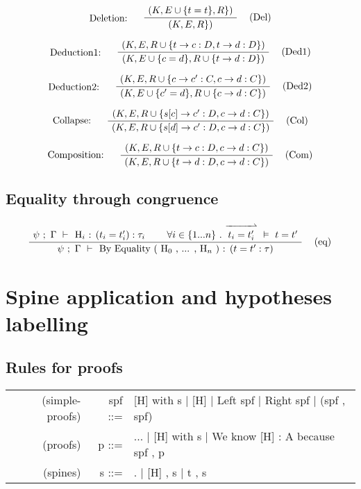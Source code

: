 \documentclass[twoside,a4paper]{article}
\theoremstyle{definition}
\begin{document}
\[
\AxiomC{$(K,E \cup \{t = t \},R\})$}
\LeftLabel{Deletion: \quad}
\RightLabel{\quad (Del)}
\UnaryInfC{$(K,E,R\})$}
\DisplayProof
\]

\[
\AxiomC{$(K,E,R \cup \{t \rightarrow c : D , t \rightarrow d : D \})$}
\LeftLabel{Deduction1: \quad}
\RightLabel{\quad (Ded1)}
\UnaryInfC{$(K,E \cup \{c = d \},R \cup \{t \rightarrow d : D\})$}
\DisplayProof
\]

\[
\AxiomC{$(K,E,R \cup \{c \rightarrow c' : C , c \rightarrow d : C \})$}
\LeftLabel{Deduction2: \quad}
\RightLabel{\quad (Ded2)}
\UnaryInfC{$(K,E \cup \{c' = d \},R \cup \{c \rightarrow d : C\})$}
\DisplayProof
\]

\[
\AxiomC{$(K,E,R \cup \{s[c] \rightarrow c' : D , c \rightarrow d : C \})$}
\LeftLabel{Collapse: \quad}
\RightLabel{\quad (Col)}
\UnaryInfC{$(K,E,R \cup \{s[d] \rightarrow c' : D , c \rightarrow d : C \})$}
\DisplayProof
\]

\[
\AxiomC{$(K,E,R \cup \{t \rightarrow c : D , c \rightarrow d : C \})$}
\LeftLabel{Composition: \quad}
\RightLabel{\quad (Com)}
\UnaryInfC{$(K,E,R \cup \{t \rightarrow d : D , c \rightarrow d : C \})$}
\DisplayProof
\]

\subsection{Equality through congruence}

\[
\AxiomC{$\psi~ ;~ \Gamma ~\vdash~$ H$_i$ : $(t_i = t_i ') : \tau_i$}
\AxiomC{$\forall i \in \{1 ... n\}~ . ~ \overset{\xrightharpoonup{~~~~~~~~}}{t_i = t_i '} ~\vDash~ t = t'$}
\RightLabel{\quad (eq)}
\BinaryInfC{$\psi~ ;~ \Gamma ~\vdash~$ By Equality ( H$_0$ , ... , H$_n$ ) : ($t = t' : \tau$)}
\DisplayProof
\]

\section{Spine application and hypotheses labelling}

\subsection{Rules for proofs}

\begin{center}
\begin{tabular}{rrl}

(simple-proofs) & \quad spf ::=& [H] with s $\mid$ [H] $\mid$ Left spf $\mid$  Right spf $\mid$ (spf , spf)
\\
(proofs) & \quad p ::=& ... $\mid$ [H] with s $\mid$ We know [H] : A because spf , p
\\
(spines) & \quad s ::=& . $\mid$ [H] , s $\mid$ t , s

\end{tabular}
\end{center}
\end{document}
